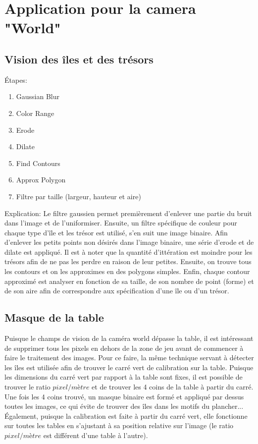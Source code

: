 \section{Application pour la camera "World"} 

\subsection{Vision des îles et des trésors}

Étapes:
\begin{enumerate}
\item Gaussian Blur
\item Color Range
\item Erode
\item Dilate
\item Find Contours
\item Approx Polygon
\item Filtre par taille (largeur, hauteur et aire)
\end{enumerate}


Explication: Le filtre gaussien permet premièrement d'enlever une partie du bruit dans l'image et de l'uniformiser. Ensuite, un filtre spécifique de couleur pour chaque type d'île et les trésor est utilisé, s'en suit une image binaire. Afin d'enlever les petits points non désirés dans l'image binaire, une série d'erode et de dilate est appliqué. Il est à noter que la quantité d'ittération est moindre pour les trésors afin de ne pas les perdre en raison de leur petites. Ensuite, on trouve tous les contours et on les approximes en des polygons simples. Enfin, chaque contour approximé est analyser en fonction de sa taille, de son nombre de point (forme) et de son aire afin de correspondre aux spécification d'une île ou d'un trésor. 

\subsection{Masque de la table}

Puisque le champs de vision de la caméra world dépasse la table, il est intéressant de supprimer tous les pixels en dehors de la zone de jeu avant de commencer à faire le traitement des images. Pour ce faire, la même technique servant à détecter les îles est utilisée afin de trouver le carré vert de calibration sur la table. Puisque les dimensions du carré vert par rapport à la table sont fixes, il est possible de trouver le ratio $pixel/mètre$ et de trouver les 4 coins de la table à partir du carré. Une fois les 4 coins trouvé, un masque binaire est formé et appliqué par dessus toutes les images, ce qui évite de trouver des îles dans les motifs du plancher... Également, puisque la calibration est faite à partir du carré vert, elle fonctionne sur toutes les tables en s'ajustant à sa position relative sur l'image (le ratio $pixel/mètre$ est différent d'une table à l'autre).



